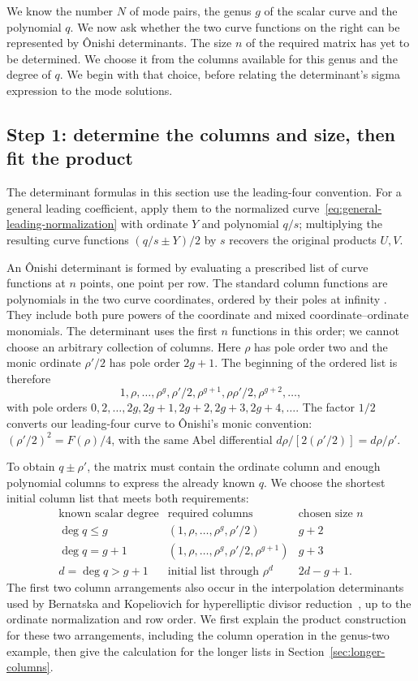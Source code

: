 \documentclass[11pt]{article}
\begin{document}
We know the number $N$ of mode pairs, the genus $g$ of the scalar curve and the polynomial $q$. We now ask whether the two curve functions on the right can be represented by \^Onishi determinants. The size $n$ of the required matrix has yet to be determined. We choose it from the columns available for this genus and the degree of $q$. We begin with that choice, before relating the determinant's sigma expression to the mode solutions.

\subsection{Step 1: determine the columns and size, then fit the product}

The determinant formulas in this section use the leading-four convention. For a general leading coefficient, apply them to the normalized curve~\eqref{eq:general-leading-normalization} with ordinate $Y$ and polynomial $q/s$; multiplying the resulting curve functions $(q/s\pm Y)/2$ by $s$ recovers the original products $U,V$.

An \^Onishi determinant is formed by evaluating a prescribed list of curve functions at $n$ points, one point per row. The standard column functions are polynomials in the two curve coordinates, ordered by their poles at infinity \cite[Theorem~7.2]{onishi}. They include both pure powers of the coordinate and mixed coordinate--ordinate monomials. The determinant uses the first $n$ functions in this order; we cannot choose an arbitrary collection of columns. Here $\rho$ has pole order two and the monic ordinate $\rho'/2$ has pole order $2g+1$. The beginning of the ordered list is therefore
\begin{equation}\label{eq:onishi-pole-columns}
1,\rho,\ldots,\rho^g,\rho'/2,\rho^{g+1},\rho\rho'/2,\rho^{g+2},\ldots,
\end{equation}
with pole orders $0,2,\ldots,2g,2g+1,2g+2,2g+3,2g+4,\ldots$. The factor $1/2$ converts our leading-four curve to \^Onishi's monic convention: $(\rho'/2)^2=F(\rho)/4$, with the same Abel differential $d\rho/[2(\rho'/2)]=d\rho/\rho'$.

To obtain $q\pm\rho'$, the matrix must contain the ordinate column and enough polynomial columns to express the already known $q$. We choose the shortest initial column list that meets both requirements:
\[
\begin{array}{c|c|c}
\text{known scalar degree}&\text{required columns}&\text{chosen size }n\\\hline
\deg q\le g &(1,\rho,\ldots,\rho^g,\rho'/2)&g+2\\
\deg q=g+1 &(1,\rho,\ldots,\rho^g,\rho'/2,\rho^{g+1})&g+3\\
d=\deg q>g+1 &\text{initial list through }\rho^d&2d-g+1.
\end{array}
\]
The first two column arrangements also occur in the interpolation determinants used by Bernatska and Kopeliovich for hyperelliptic divisor reduction~\cite[Sections~3.1--3.2]{divisor-addition}, up to the ordinate normalization and row order. We first explain the product construction for these two arrangements, including the column operation in the genus-two example, then give the calculation for the longer lists in Section~\ref{sec:longer-columns}.
\end{document}
